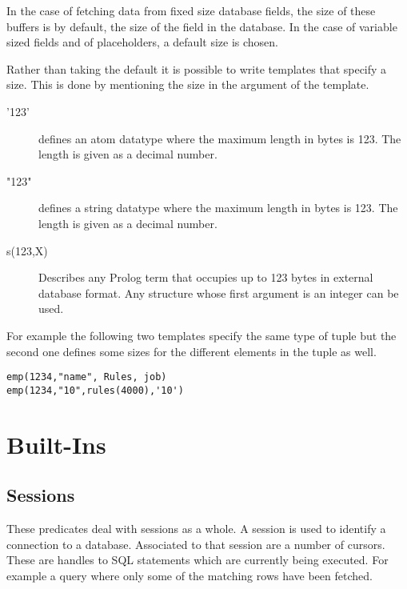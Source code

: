 In the case of fetching data from fixed size database fields, the size of
these buffers is by default, the size of the field in the database.
In the case of variable sized fields and of placeholders, a default size
is chosen.

Rather than taking the default it is possible to write templates that
specify a size. This is done by mentioning the size in the argument of
the template.

\begin{description}
\item['123'] defines an atom datatype where the maximum length in
bytes is 123. The length is given as a decimal number.

\item["123"] defines a string datatype where the maximum length in
bytes is 123. The length is given as a decimal number.

\item[s(123,X)] Describes any Prolog term that occupies up to 123 bytes
in external database format. Any structure whose first argument is an integer
can be used.
\end{description}

For example the following two templates specify the same type of tuple
but the second one defines some sizes for the different elements in the
tuple as well.
\begin{verbatim}
emp(1234,"name", Rules, job)
emp(1234,"10",rules(4000),'10')
\end{verbatim}

\section{Built-Ins}

\subsection{Sessions}

These predicates deal with sessions as a whole. A session is 
used to identify a connection to a database. Associated to that
session are a number of cursors. These are handles to SQL statements
which are currently being executed. For example a query where only
some of the matching rows have been fetched.


